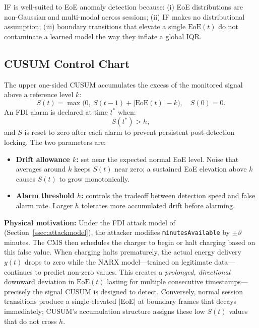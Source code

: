 \documentclass[journal]{IEEEtran}
\newcommand{\eoe}{\mathrm{EoE}}
\begin{document}
IF is well-suited to EoE anomaly detection because: (i) EoE
distributions are non-Gaussian and multi-modal across sessions;
(ii) IF makes no distributional assumption; (iii) boundary transitions
that elevate a single $\eoe(t)$ do not contaminate a learned model the
way they inflate a global IQR.

\subsection{CUSUM Control Chart}

The upper one-sided CUSUM \cite{page1954} accumulates the excess of
the monitored signal above a reference level $k$:
\begin{equation}
S(t) = \max\bigl(0,\ S(t{-}1) + |\eoe(t)| - k\bigr),\quad S(0)=0.
\label{eq:cusum}
\end{equation}
An FDI alarm is declared at time $t^*$ when:
\begin{equation}
S(t^*) > h,
\label{eq:cusumAlarm}
\end{equation}
and $S$ is reset to zero after each alarm to prevent persistent
post-detection locking. The two parameters are:
\begin{itemize}
\item \textbf{Drift allowance $k$:} set near the expected normal EoE
level. Noise that averages around $k$ keeps $S(t)$ near zero; a
sustained EoE elevation above $k$ causes $S(t)$ to grow monotonically.
\item \textbf{Alarm threshold $h$:} controls the tradeoff between
detection speed and false alarm rate. Larger $h$ tolerates more
accumulated drift before alarming.
\end{itemize}

\textbf{Physical motivation:} Under the FDI attack model of
\cite{basumatary2025} (Section~\ref{ssec:attackmodel}), the attacker
modifies \texttt{minutesAvailable} by $\pm\vartheta$ minutes.
The CMS then schedules the charger to begin or halt charging based on
this false value. When charging halts prematurely, the actual energy
delivery $y(t)$ drops to zero while the NARX model---trained on
legitimate data---continues to predict non-zero values.
This creates a \emph{prolonged, directional} downward deviation in
$\eoe(t)$ lasting for multiple consecutive timestamps---precisely the
signal CUSUM is designed to detect. Conversely, normal session
transitions produce a single elevated $|\eoe|$ at boundary frames that
decays immediately; CUSUM's accumulation structure assigns these low
$S(t)$ values that do not cross $h$.
\end{document}

